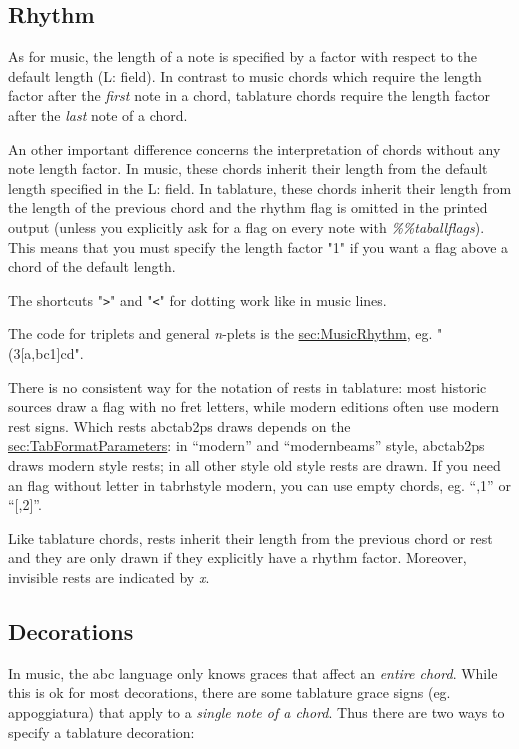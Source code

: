 \documentclass[a4paper]{article}
\begin{document}
\subsection{Rhythm}
As for music, the length of a note is specified by a factor with
respect to the default length (L: field). In contrast to music chords
which require the length factor after the {\it first} note in a chord,
tablature chords require the length factor after the {\it last} note
of a chord.
\par
An other important difference concerns the interpretation of chords
without any note length factor. In music, these chords inherit their
length from the default length specified in the L: field. In tablature,
these chords inherit their length from the length of the previous chord
and the rhythm flag is omitted in the printed output (unless you explicitly
ask for a flag on every note with {\it \%\%taballflags}). This means that you 
must specify the length factor "1" if you want a flag above a chord
of the default length.
\par
The shortcuts "\verb$>$" and "\verb$<$" for dotting work like in 
music lines.
\par
The code for triplets and general {\it n}-plets is the 
\hyperref{same as in music,}{same as in music, (see section }{)}
{sec:MusicRhythm}, eg. "(3[a,bc1]cd".
\par
{}
There is no consistent way for the notation of rests in tablature:
most historic sources draw a flag with no fret letters, while modern
editions often use modern rest signs. Which rests abctab2ps draws
depends on the 
\hyperref{tabrhstyle}{tabrhstyle (see section }{)}{sec:TabFormatParameters}:
in ``modern'' and ``modernbeams'' style, abctab2ps draws modern style rests;
in all other style
old style rests are drawn. If you need an flag without letter in tabrhstyle
modern, you can use empty chords, eg. ``,1'' or ``[,2]''.
\par
Like tablature chords, rests inherit their length from the previous 
chord or rest and they are only drawn if they explicitly have a rhythm 
factor. Moreover, invisible rests are indicated by {\it x}.

\subsection{Decorations}
  
 
In music, the abc language only knows graces that affect an 
{\it entire chord}. While this is ok for most decorations, there
are some tablature grace signs (eg. appoggiatura) that apply to a 
{\it single note of a chord}. Thus there are two ways to specify
a tablature decoration:
\end{document}
